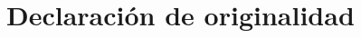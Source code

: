 \documentclass[a4paper,12pt,oneside]{book}
\begin{document}
\pagestyle{empty}

\newpage
\ %
\onehalfspace
\chapter*{Declaración de originalidad}
\thispagestyle{empty}

\newpage
\ %

%
\chapter*{}
\thispagestyle{empty}

\newpage
\ %
%

%

\frontmatter
\end{document}

